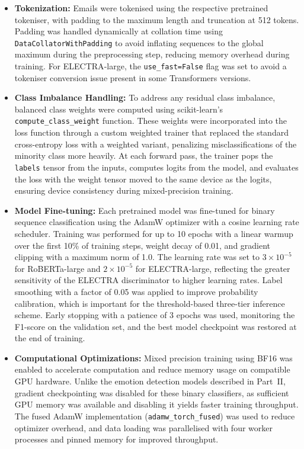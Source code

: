 \begin{itemize}
	\item \textbf{Tokenization:} Emails were tokenised using the respective pretrained tokeniser, with padding to the maximum length and truncation at 512 tokens. Padding was handled dynamically at collation time using \texttt{DataCollatorWithPadding} to avoid inflating sequences to the global maximum during the preprocessing step, reducing memory overhead during training. For \acs{ELECTRA}-large, the \texttt{use\_fast=False} flag was set to avoid a tokeniser conversion issue present in some Transformers versions.

	\item \textbf{Class Imbalance Handling:} To address any residual class imbalance, balanced class weights were computed using scikit-learn's \texttt{compute\_class\_weight} function. These weights were incorporated into the loss function through a custom weighted trainer that replaced the standard cross-entropy loss with a weighted variant, penalizing misclassifications of the minority class more heavily. At each forward pass, the trainer pops the \texttt{labels} tensor from the inputs, computes logits from the model, and evaluates the loss with the weight tensor moved to the same device as the logits, ensuring device consistency during mixed-precision training.

	\item \textbf{Model Fine-tuning:} Each pretrained model was fine-tuned for binary sequence classification using the \ac{AdamW} optimizer \cite{loshchilov2019decoupled} with a cosine learning rate scheduler. Training was performed for up to 10 epochs with a linear warmup over the first 10\% of training steps, weight decay of 0.01, and gradient clipping with a maximum norm of 1.0. The learning rate was set to $3 \times 10^{-5}$ for \acs{RoBERTa}-large and $2 \times 10^{-5}$ for \acs{ELECTRA}-large, reflecting the greater sensitivity of the ELECTRA discriminator to higher learning rates. Label smoothing with a factor of 0.05 was applied to improve probability calibration, which is important for the threshold-based three-tier inference scheme. Early stopping with a patience of 3 epochs was used, monitoring the F1-score on the validation set, and the best model checkpoint was restored at the end of training.

	\item \textbf{Computational Optimizations:} Mixed precision training using \ac{BF16} \cite{micikevicius2018mixed} was enabled to accelerate computation and reduce memory usage on compatible \ac{GPU} hardware. Unlike the emotion detection models described in Part~II, gradient checkpointing was disabled for these binary classifiers, as sufficient \ac{GPU} memory was available and disabling it yields faster training throughput. The fused AdamW implementation (\texttt{adamw\_torch\_fused}) was used to reduce optimizer overhead, and data loading was parallelised with four worker processes and pinned memory for improved throughput.


\end{itemize}
